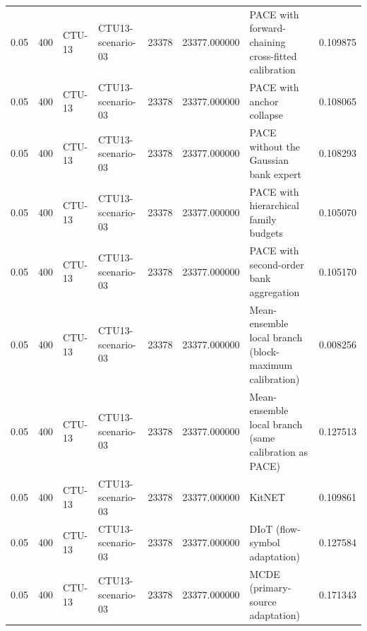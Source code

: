 \begin{tabular}{llllllll}
0.05 & 400 & CTU-13 & CTU13-scenario-03 & 23378 & 23377.000000 & PACE with forward-chaining cross-fitted calibration & 0.109875 \\
0.05 & 400 & CTU-13 & CTU13-scenario-03 & 23378 & 23377.000000 & PACE with anchor collapse & 0.108065 \\
0.05 & 400 & CTU-13 & CTU13-scenario-03 & 23378 & 23377.000000 & PACE without the Gaussian bank expert & 0.108293 \\
0.05 & 400 & CTU-13 & CTU13-scenario-03 & 23378 & 23377.000000 & PACE with hierarchical family budgets & 0.105070 \\
0.05 & 400 & CTU-13 & CTU13-scenario-03 & 23378 & 23377.000000 & PACE with second-order bank aggregation & 0.105170 \\
0.05 & 400 & CTU-13 & CTU13-scenario-03 & 23378 & 23377.000000 & Mean-ensemble local branch (block-maximum calibration) & 0.008256 \\
0.05 & 400 & CTU-13 & CTU13-scenario-03 & 23378 & 23377.000000 & Mean-ensemble local branch (same calibration as PACE) & 0.127513 \\
0.05 & 400 & CTU-13 & CTU13-scenario-03 & 23378 & 23377.000000 & KitNET & 0.109861 \\
0.05 & 400 & CTU-13 & CTU13-scenario-03 & 23378 & 23377.000000 & DIoT (flow-symbol adaptation) & 0.127584 \\
0.05 & 400 & CTU-13 & CTU13-scenario-03 & 23378 & 23377.000000 & MCDE (primary-source adaptation) & 0.171343 \\
\bottomrule
\end{tabular}
